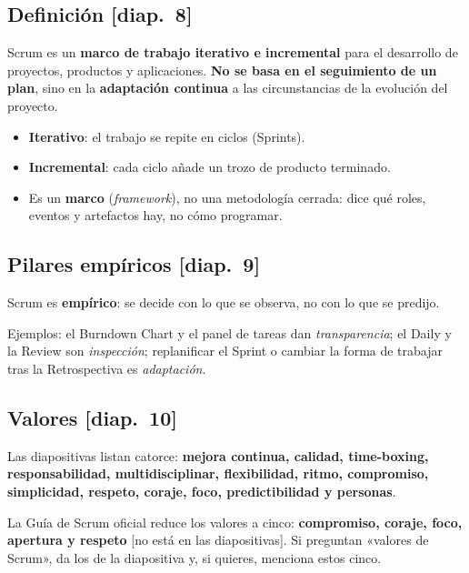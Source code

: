 \documentclass[11pt,a4paper,oneside,openany]{report}
\newcommand{\diap}[1]{\textcolor{mdaPrimary}{\small[diap.~#1]}}
\newcommand{\extra}{\textcolor{mdaOrange}{\small[no está en las diapositivas]}}
\begin{document}
\subsection{Definición \diap{8}}
\begin{definicion}[Scrum]
Scrum es un \textbf{marco de trabajo iterativo e incremental} para el desarrollo de proyectos, productos y
aplicaciones. \textbf{No se basa en el seguimiento de un plan}, sino en la \textbf{adaptación continua} a las
circunstancias de la evolución del proyecto.
\end{definicion}
\begin{itemize}[leftmargin=*]
  \item \textbf{Iterativo}: el trabajo se repite en ciclos (Sprints).
  \item \textbf{Incremental}: cada ciclo añade un trozo de producto terminado.
  \item Es un \textbf{marco} (\emph{framework}), no una metodología cerrada: dice qué roles, eventos y artefactos hay,
        no cómo programar.
\end{itemize}

\subsection{Pilares empíricos \diap{9}}
Scrum es \textbf{empírico}: se decide con lo que se observa, no con lo que se predijo.
\begin{center}
\end{center}
Ejemplos: el Burndown Chart y el panel de tareas dan \emph{transparencia}; el Daily y la Review son
\emph{inspección}; replanificar el Sprint o cambiar la forma de trabajar tras la Retrospectiva es
\emph{adaptación}.

\subsection{Valores \diap{10}}
Las diapositivas listan catorce: \textbf{mejora continua, calidad, time-boxing, responsabilidad,
multidisciplinar, flexibilidad, ritmo, compromiso, simplicidad, respeto, coraje, foco, predictibilidad y personas}.
\begin{aviso}
La Guía de Scrum oficial reduce los valores a cinco: \textbf{compromiso, coraje, foco, apertura y respeto}
\extra. Si preguntan «valores de Scrum», da los de la diapositiva y, si quieres, menciona estos cinco.
\end{aviso}
\end{document}

